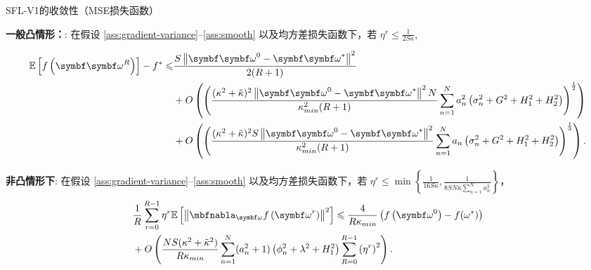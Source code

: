 \begin{theorem}{SFL-V1的收敛性（MSE损失函数）}\label{theorem-v1-full-mse}

\noindent \textbf{一般凸情形：}:  在假设 \ref{ass:gradient-variance}--\ref{ass:smooth} 以及均方差损失函数下，若 $\eta^r \leq \frac{1}{2 S\kappa}$, 

\begin{equation}\label{bound-v1-gc-full}
\begin{aligned}
\mathbb{E}\left[f\left(\boldsymbol{\omegab}^{R}\right)\right]-f^*\le &\frac{S\left\|\boldsymbol{\omegab}^{0}-\boldsymbol{\omegab}^{\ast}\right\|^2}{2(R+1)}\\ 
&+ O\left(\left(\frac{(\kappa^2+\tilde{\kappa})^2\left\|\boldsymbol{\omegab}^{0}-\boldsymbol{\omegab}^{\ast}\right\|^2 N}{\kappa_{min}^2(R+1)}\sum_{n=1}^Na_n^2\left(\sigma_n^2+G^2+H_1^2+H_2^2\right)\right)^{\frac{1}{2}}\right)\\
    &+O\left(\left(\frac{(\kappa^2+\tilde{\kappa})^2S \left\|\boldsymbol{\omegab}^{0}-\boldsymbol{\omegab}^{\ast}\right\|^2}{\kappa_{min}^2(R+1)}\sum_{n=1}^Na_n\left(\sigma_n^2+G^2+H_1^2+H_2^2\right)\right)^{\frac{1}{3}}\right).
\end{aligned}
\end{equation}

\noindent \textbf{非凸情形下}: 在假设 \ref{ass:gradient-variance}--\ref{ass:smooth} 以及均方差损失函数下，若 
$\eta^r \leq \min\left\{ \frac{1}{16S\kappa},  \frac{1}{8SN\kappa\sum_{n=1}^Na_n^2}\right\}$，
\begin{equation}\label{bound-v1-nc-full}
\begin{aligned}
&\frac{1}{R}\sum_{r=0}^{R-1}\eta^r\mathbb{E}\left[\left\Vert
\nabla_{\omegab}f\left(\omegab^{r}\right)\right\Vert^2\right]\leq \frac{4}{R\kappa_{min}}\left(f\left(\omegab^{0}\right)-f(\omega^*)\right)\\
&+O\left(\frac{NS(\kappa^2+\tilde{\kappa}^2)}{R\kappa_{min}} \sum_{n=1}^N(a_n^2+1)\left(\phi_n^2+\lambda^2+H_1^2\right)\sum_{R=0}^{R-1}\left(\eta^r\right)^2\right).
\end{aligned}
\end{equation}
\end{theorem}

